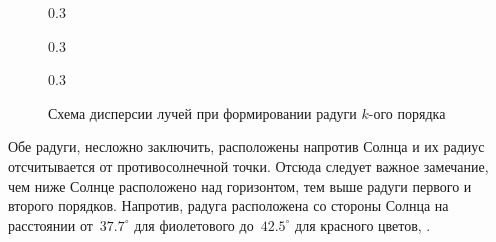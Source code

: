 \begin{figure}[h!]
    \begin{subcaptionblock}{0.3\tw}
        \centering
        \caption{$k=1$}
        \label{pic:rainbow-disp-1}
    \end{subcaptionblock}
    \hfill
    \begin{subcaptionblock}{0.3\tw}
        \centering
        \caption{$k=2$}
        \label{pic:rainbow-disp-2}
    \end{subcaptionblock}
    \hfill
    \begin{subcaptionblock}{0.3\tw}
        \centering
        \caption{$k=3$}
        \label{pic:rainbow-disp-3}
    \end{subcaptionblock}
    \caption{Схема дисперсии лучей при формировании радуги $k$-ого порядка}
\end{figure}

Обе радуги, несложно заключить, расположены напротив Солнца и их радиус отсчитывается от противосолнечной точки. Отсюда следует важное замечание, чем ниже Солнце расположено над горизонтом, тем выше радуги первого и второго порядков. Напротив,  радуга расположена со стороны Солнца на расстоянии от~$37.7^\circ$ для фиолетового до~$42.5^\circ$ для красного цветов, .


